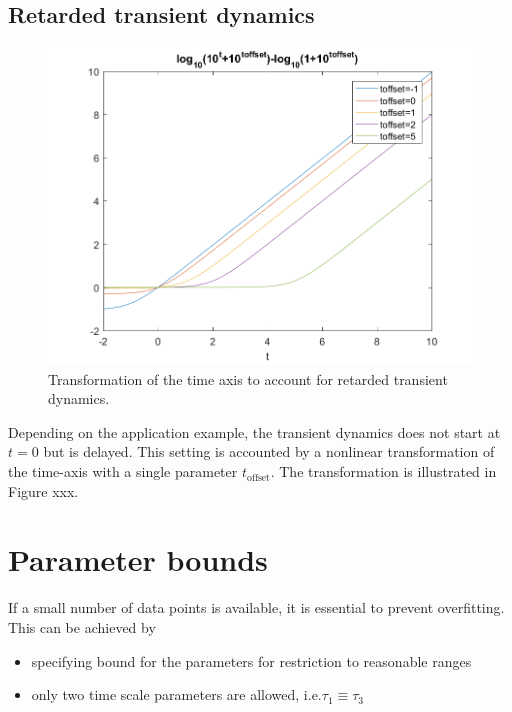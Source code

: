 \documentclass[pdftex, a4paper]{scrartcl}	%
\begin{document}
\subsection{Retarded transient dynamics}
\begin{figure}[!t]
\begin{center}
\includegraphics{TimeOffset_TransientFunction.png}
\end{center}
\caption{Transformation of the time axis to account for retarded transient dynamics. \label{fig:retarded}}
\end{figure} 

Depending on the application example, the transient dynamics does not start at $t=0$ but is delayed.
This setting is accounted by a nonlinear transformation of the time-axis with a single parameter $t_\text{offset}$.
The transformation is illustrated in Figure xxx.


\section{Parameter bounds}
If a small number of data points is available, it is essential to prevent overfitting.
This can be achieved by 
\begin{itemize}
\item 	specifying bound for the parameters for restriction to reasonable ranges
\item  only two time scale parameters are allowed, i.e.$\tau_1\equiv\tau_3$
\end{itemize}
\end{document}
